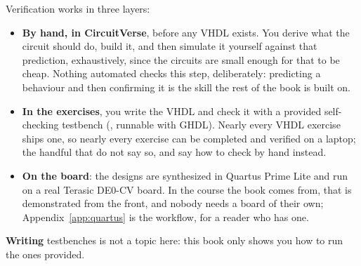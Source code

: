 Verification works in three layers:
\begin{itemize}
  \item \textbf{By hand, in CircuitVerse}, before any VHDL exists. You derive what the circuit
    should do, build it, and then simulate it yourself against that prediction, exhaustively,
    since the circuits are small enough for that to be cheap. Nothing automated checks this step,
    deliberately: predicting a behaviour and then confirming it is the skill the rest of the book is
    built on.
  \item \textbf{In the exercises}, you write the VHDL and check it with a provided self-checking
    testbench (, runnable with GHDL). Nearly every VHDL exercise ships one,
    so nearly every exercise can be completed and verified on a laptop; the handful that do not say
    so, and say how to check by hand instead.
  \item \textbf{On the board}: the designs are synthesized in Quartus Prime Lite and run on a real
    Terasic DE0-CV board. In the course the book comes from, that is demonstrated from the front,
    and nobody needs a board of their own; Appendix~\ref{app:quartus} is the workflow, for a reader
    who has one.
\end{itemize}

\textbf{Writing} testbenches is not a topic here: this book only shows you how to run the ones
provided.

